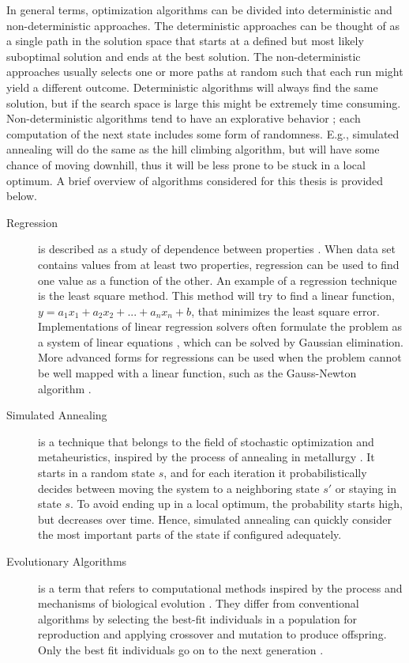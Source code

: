 In general terms, optimization algorithms can be divided into deterministic and
non-deterministic approaches. The deterministic approaches can be thought of as
a single path in the solution space that starts at a defined but most likely
suboptimal solution and ends at the best solution. The non-deterministic
approaches usually selects one or more paths at random such that each run might
yield a different outcome. Deterministic algorithms will always find the same
solution, but if the search space is large this might be extremely time
consuming. Non-deterministic algorithms tend to have an explorative behavior
\cite{poli2008field}; each computation of the next state includes some form of
randomness. E.g., simulated annealing will do the same as the hill climbing
algorithm, but will have some chance of moving downhill, thus it will be less
prone to be stuck in a local optimum. A brief overview of algorithms considered
for this thesis is provided below.


\begin{description}
    \item[Regression] is described as a study of dependence between properties
        \cite{weisberg2005applied}. When data set contains values from at least
        two properties, regression can be used to find one value as a function
        of the other. An example of a regression technique is the least square
        method. This method will try to find a linear function,
        $y=a_1x_1+a_2x_2+...+a_nx_n+b$, that minimizes the least square error.
        Implementations of linear regression solvers often formulate the problem
        as a system of linear equations \cite{lay2011linear}, which can be
        solved by Gaussian elimination. More advanced forms for regressions can
        be used when the problem cannot be well mapped with a linear function,
        such as the Gauss-Newton algorithm \cite{myers1990classical}.

    \item[Simulated Annealing] is a technique that belongs to the field of
        stochastic optimization and metaheuristics, inspired by the process of
        annealing in metallurgy \cite{van1987simulated}. It starts in a random
        state $s$, and for each iteration it probabilistically decides between
        moving the system to a neighboring state $s'$ or staying in state $s$.
        To avoid ending up in a local optimum, the probability starts high, but
        decreases over time. Hence, simulated annealing can quickly consider the
        most important parts of the state if configured adequately.

    \item[Evolutionary Algorithms] is a term that refers to computational
        methods inspired by the process and mechanisms of biological evolution
        \cite{fogel1997evolutionary}.  They differ from conventional algorithms
        by selecting the best-fit individuals in a population for reproduction
        and applying crossover and mutation to produce offspring. Only the best
        fit individuals go on to the next generation \cite{introtoga}.

\end{description}

